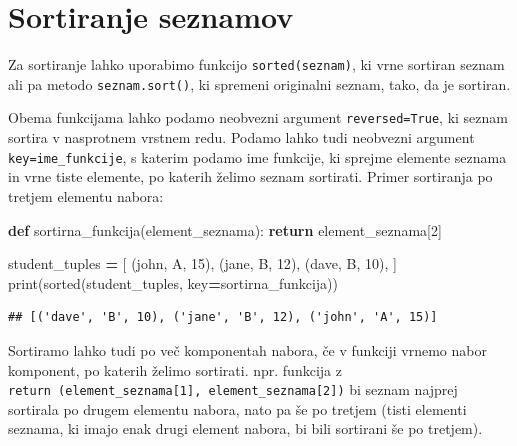 \documentclass[
]{report}
\newenvironment{Shaded}{\begin{snugshade}}{\end{snugshade}}
\newcommand{\BuiltInTok}[1]{#1}
\newcommand{\ControlFlowTok}[1]{\textcolor[rgb]{0.13,0.29,0.53}{\textbf{#1}}}
\newcommand{\DecValTok}[1]{\textcolor[rgb]{0.00,0.00,0.81}{#1}}
\newcommand{\KeywordTok}[1]{\textcolor[rgb]{0.13,0.29,0.53}{\textbf{#1}}}
\newcommand{\NormalTok}[1]{#1}
\newcommand{\OperatorTok}[1]{\textcolor[rgb]{0.81,0.36,0.00}{\textbf{#1}}}
\newcommand{\StringTok}[1]{\textcolor[rgb]{0.31,0.60,0.02}{#1}}
\begin{document}
\hypertarget{sortiranje-seznamov}{%
\section{Sortiranje seznamov}\label{sortiranje-seznamov}}

Za sortiranje lahko uporabimo funkcijo \texttt{sorted(seznam)}, ki vrne sortiran seznam ali pa metodo \texttt{seznam.sort()}, ki spremeni originalni seznam, tako, da je sortiran.

Obema funkcijama lahko podamo neobvezni argument \texttt{reversed=True}, ki seznam sortira v nasprotnem vrstnem redu. Podamo lahko tudi neobvezni argument \texttt{key=ime\_funkcije}, s katerim podamo ime funkcije, ki sprejme elemente seznama in vrne tiste elemente, po katerih želimo seznam sortirati. Primer sortiranja po tretjem elementu nabora:

\begin{Shaded}
\begin{Highlighting}[]
\KeywordTok{def}\NormalTok{ sortirna\_funkcija(element\_seznama):}
    \ControlFlowTok{return}\NormalTok{ element\_seznama[}\DecValTok{2}\NormalTok{]}

\NormalTok{student\_tuples }\OperatorTok{=}\NormalTok{ [}
\NormalTok{    (}\StringTok{\textquotesingle{}john\textquotesingle{}}\NormalTok{, }\StringTok{\textquotesingle{}A\textquotesingle{}}\NormalTok{, }\DecValTok{15}\NormalTok{),}
\NormalTok{    (}\StringTok{\textquotesingle{}jane\textquotesingle{}}\NormalTok{, }\StringTok{\textquotesingle{}B\textquotesingle{}}\NormalTok{, }\DecValTok{12}\NormalTok{),}
\NormalTok{    (}\StringTok{\textquotesingle{}dave\textquotesingle{}}\NormalTok{, }\StringTok{\textquotesingle{}B\textquotesingle{}}\NormalTok{, }\DecValTok{10}\NormalTok{),}
\NormalTok{]}
\BuiltInTok{print}\NormalTok{(}\BuiltInTok{sorted}\NormalTok{(student\_tuples, key}\OperatorTok{=}\NormalTok{sortirna\_funkcija))}
\end{Highlighting}
\end{Shaded}

\begin{verbatim}
## [('dave', 'B', 10), ('jane', 'B', 12), ('john', 'A', 15)]
\end{verbatim}

Sortiramo lahko tudi po več komponentah nabora, če v funkciji vrnemo nabor komponent, po katerih želimo sortirati. npr. funkcija z \texttt{return\ (element\_seznama{[}1{]},\ element\_seznama{[}2{]})} bi seznam najprej sortirala po drugem elementu nabora, nato pa še po tretjem (tisti elementi seznama, ki imajo enak drugi element nabora, bi bili sortirani še po tretjem).
\end{document}

